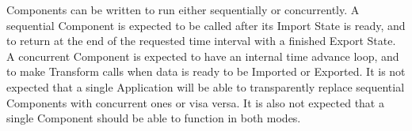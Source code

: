 %


Components can be written to run either sequentially or concurrently.
A sequential Component is expected to be called after
its Import State is ready, and to return at the end of the requested
time interval with a finished Export State.  A concurrent Component
is expected to have an internal time advance loop, and to make 
Transform calls when data is ready to be Imported or Exported.
It is not expected that a single Application will be able to 
transparently replace sequential Components with concurrent ones
or visa versa.
It is also not expected that a single Component should be able 
to function in both modes.  


